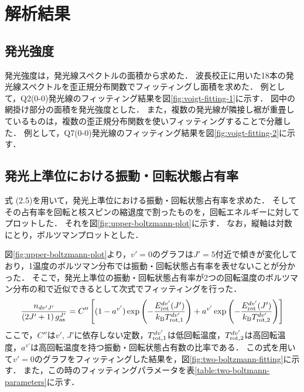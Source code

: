 \chapter{解析結果}

\section{発光強度}
発光強度は，発光線スペクトルの面積から求めた．
波長校正に用いた18本の発光線スペクトルを歪正規分布関数でフィッティングし面積を求めた．
例として，Q2(0-0)発光線のフィッティング結果を図\ref{fig:voigt-fitting-1}に示す．
図中の網掛け部分の面積を発光強度とした．
また，複数の発光線が隣接し裾が重畳しているものは，複数の歪正規分布関数を使いフィッティングすることで分離した．
例として，Q7(0-0)発光線のフィッティング結果を図\ref{fig:voigt-fitting-2}に示す．

\section{発光上準位における振動・回転状態占有率}
式 (2.5)を用いて，発光上準位における振動・回転状態占有率を求めた．
そしてその占有率を回転と核スピンの縮退度で割ったものを，回転エネルギーに対してプロットした．
それを図\ref{fig:upper-boltzmann-plot}に示す．
なお，縦軸は対数にとり，ボルツマンプロットとした．

図\ref{fig:upper-boltzmann-plot}より，$v'=0$のグラフは$J'=5$付近で傾きが変化しており，1温度のボルツマン分布では振動・回転状態占有率を表せないことが分かった．
そこで，発光上準位の振動・回転状態占有率が2つの回転温度のボルツマン分布の和で近似できるとして次式でフィッティングを行った．
\begin{equation}
    \frac{n_{dv'J'}}{\left( 2J'+1 \right)g^{J'}_{\rm as}} = C'' \left[ (1-a^{v'})\exp \left( - \frac{E^{dv'}_{\rm rot}(J')}{k_{\rm B} T^{dv'}_{\rm rot,1}} \right)+ a^{v'} \exp \left( - \frac{E^{dv'}_{\rm rot}(J')}{k_{\rm B} T^{dv'}_{\rm rot,2}} \right) \right]
\end{equation}
ここで，$C''$は$v'$, $J'$に依存しない定数，$T^{dv'}_{\rm rot,1}$は低回転温度，$T^{dv'}_{\rm rot,2}$は高回転温度，$a^{v'}$は高回転温度を持つ振動・回転状態占有数の比率である．
この式を用いて$v'=0$のグラフをフィッティングした結果を，図\ref{fig:two-boltzmann-fitting}に示す．
また，この時のフィッティングパラメータを表\ref{table:two-boltmann-parameters}に示す．

